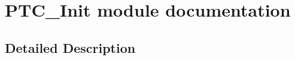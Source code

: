 \hypertarget{group___p_t_c___init__module}{}\section{P\+T\+C\+\_\+\+Init module documentation}
\label{group___p_t_c___init__module}


\subsection{Detailed Description}

